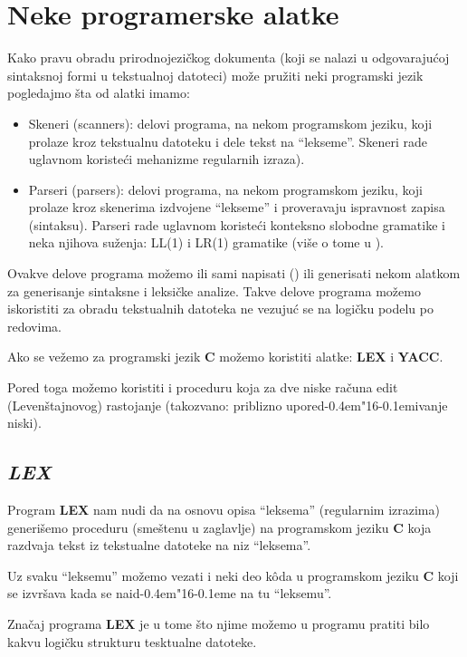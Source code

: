\documentclass[12pt,a4paper]{article}
\def\d{d\kern-0.4em\char"16\kern-0.1em}
\begin{document}
  \section{Neke programerske alatke}
    Kako pravu obradu prirodnojezi\v ckog dokumenta (koji se nalazi u
    odgovaraju\'coj sintaksnoj formi u tekstualnoj datoteci) mo\v ze
    pru\v ziti neki programski jezik pogledajmo \v sta od alatki imamo:
    \begin{itemize}
    \item
      Skeneri (scanners): delovi programa, na nekom programskom jeziku, koji
      prolaze kroz tekstualnu datoteku i dele tekst na ``lekseme''.
      Skeneri rade uglavnom koriste\'ci mehanizme regularnih izraza).
    \item
      Parseri (parsers): delovi programa, na nekom programskom jeziku, koji
      prolaze kroz skenerima izdvojene ``lekseme'' i proveravaju ispravnost
      zapisa (sintaksu).
      Parseri rade uglavnom koriste\'ci konteksno slobodne gramatike i neka
      njihova su\v zenja: LL(1) i LR(1) gramatike (vi\v se o tome u
      \cite{AU}).
    \end{itemize}

    Ovakve delove programa mo\v zemo ili sami napisati (\cite{AU}) ili
    generisati nekom alatkom za generisanje sintaksne i leksi\v cke analize.
    Takve delove programa mo\v zemo iskoristiti za obradu tekstualnih datoteka
    ne vezuju\'c se na logi\v cku podelu po redovima.

    Ako se ve\v zemo za programski jezik {\bf C} mo\v zemo koristiti alatke:
    {\bf LEX} i {\bf YACC}.

    Pored toga mo\v zemo koristiti i proceduru koja za dve niske ra\v cuna
    edit (Leven\v stajnovog) rastojanje (takozvano: priblizno upore\d ivanje
    niski).
%
    \subsection{\em LEX}
      Program {\bf LEX} nam nudi da na osnovu opisa ``leksema'' (regularnim
      izrazima) generi\v semo proceduru (sme\v stenu u zaglavlje) na
      programskom jeziku {\bf C} koja razdvaja tekst iz tekstualne datoteke na
      niz ``leksema''.

      Uz svaku ``leksemu'' mo\v zemo vezati i neki deo k\^oda u programskom
      jeziku {\bf C} koji se izvr\v sava kada se nai\d e na tu ``leksemu''.

      Zna\v caj programa {\bf LEX} je u tome \v sto njime mo\v zemo u programu
      pratiti bilo kakvu logi\v cku strukturu tesktualne datoteke.
\end{document}
